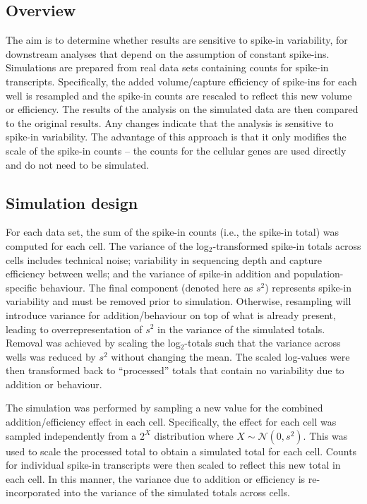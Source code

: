 \documentclass{article}
\begin{document}
\subsection{Overview}
The aim is to determine whether results are sensitive to spike-in variability, for downstream analyses that depend on the assumption of constant spike-ins.
Simulations are prepared from real data sets containing counts for spike-in transcripts.
Specifically, the added volume/capture efficiency of spike-ins for each well is resampled and the spike-in counts are rescaled to reflect this new volume or efficiency.
The results of the analysis on the simulated data are then compared to the original results.
Any changes indicate that the analysis is sensitive to spike-in variability.
The advantage of this approach is that it only modifies the scale of the spike-in counts -- the counts for the cellular genes are used directly and do not need to be simulated.

\subsection{Simulation design}
For each data set, the sum of the spike-in counts (i.e., the spike-in total) was computed for each cell.
The variance of the log$_2$-transformed spike-in totals across cells includes technical noise; variability in sequencing depth and capture efficiency between wells; and the variance of spike-in addition and population-specific behaviour.
The final component (denoted here as $s^2$) represents spike-in variability and must be removed prior to simulation.
Otherwise, resampling will introduce variance for addition/behaviour on top of what is already present, leading to overrepresentation of $s^2$ in the variance of the simulated totals.
Removal was achieved by scaling the log$_2$-totals such that the variance across wells was reduced by $s^2$ without changing the mean.
The scaled log-values were then transformed back to ``processed'' totals that contain no variability due to addition or behaviour.

The simulation was performed by sampling a new value for the combined addition/efficiency effect in each cell.
Specifically, the effect for each cell was sampled independently from a $2^X$ distribution where $X \sim \mathcal{N}(0, s^2)$.
This was used to scale the processed total to obtain a simulated total for each cell.
Counts for individual spike-in transcripts were then scaled to reflect this new total in each cell.
In this manner, the variance due to addition or efficiency is re-incorporated into the variance of the simulated totals across cells.
\end{document}
